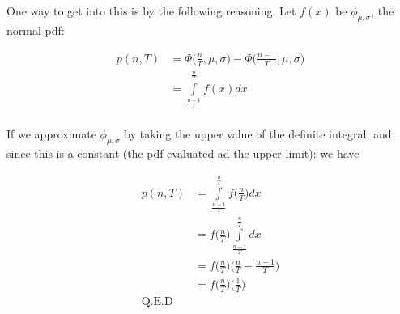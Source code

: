 \documentclass[11pt]{article}
\begin{document}
    One way to get into this is by the following reasoning. Let $f(x)$ be $\phi_{\mu,\sigma}$, the normal pdf:

    \begin{align*}
        p(n,T) &= \Phi \Big ( \frac{n}{T}, \mu, \sigma \Big) - \Phi \Big ( \frac{n - 1}{T},\mu,\sigma \Big)\\
               &= \int\limits_{\frac{n-1}{T}}^{\frac{n}{T}} f(x)dx\\
    \end{align*}

    If we approximate $\phi_{\mu,\sigma}$ by taking the upper value of the definite integral, and
    since this is a constant (the pdf evaluated ad the upper limit): we have

    \begin{align*}
        p(n,T) &= \int\limits_{\frac{n-1}{T}}^{\frac{n}{T}} f \Big( \frac{n}{T} \Big)dx\\
               &= f \Big (\frac{n}{T} \Big)\int\limits_{\frac{n-1}{T}}^{\frac{n}{T}}dx \\
               &= f \Big (\frac{n}{T} \Big) \Big (\frac{n}{T} - \frac{n-1}{T} \Big) \\
               &= f \Big (\frac{n}{T} \Big) \Big (\frac{1}{T} \Big) \\
        \text{Q.E.D}
    \end{align*}
\end{document}
